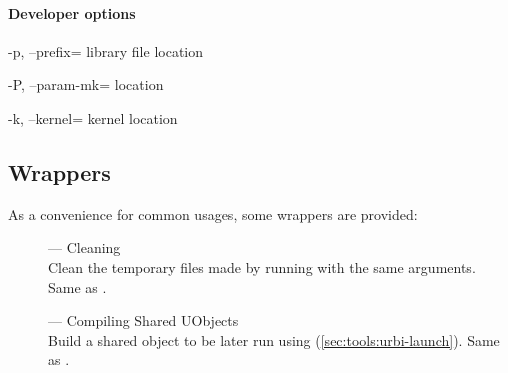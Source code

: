 \paragraph{Developer options}
\begin{options}
\item[-p, --prefix=\var{dir}] library file location
\item[-P, --param-mk=\var{file}]  location
\item[-k, --kernel=\var{dir}] kernel location
\end{options}


\subsection{ Wrappers}
\label{sec:tools:umake:wrappers}

As a convenience for common  usages, some wrappers are
provided:
\begin{description}
\item[] --- Cleaning\\
  Clean the temporary files made by running  with the
  same arguments.  Same as .
\item[] --- Compiling Shared UObjects\\
  Build a shared object to be later run using 
  (\autoref{sec:tools:urbi-launch}).  Same as .
\end{description}

